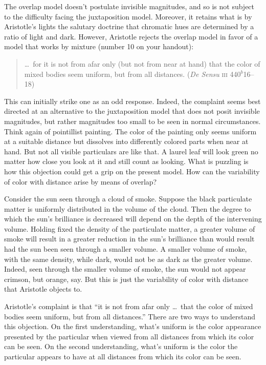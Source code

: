 The overlap model doesn't postulate invisible magnitudes, and so is not subject to the difficulty facing the juxtaposition model. Moreover, it retains what is by Aristotle's lights the salutary doctrine that chromatic hues are determined by a ratio of light and dark. However, Aristotle rejects the overlap model in favor of a model that works by mixture (number 10 on your handout):
\begin{quote}
	\ldots\ for it is not from afar only (but not from near at hand) that the color of mixed bodies seem uniform, but from all distances. (\emph{De Sensu} \textsc{iii} 440\( ^{b} \)16--18)
\end{quote}
This can initially strike one as an odd response. Indeed, the complaint seems best directed at an alternative to the juxtaposition model that does not posit invisible magnitudes, but rather magnitudes too small to be seen in normal circumstances. Think again of pointillist painting. The color of the painting only seems uniform at a suitable distance but dissolves into differently colored parts when near at hand. But not all visible particulars are like that. A laurel leaf will look green no matter how close you look at it and still count as looking. What is puzzling is how this objection could get a grip on the present model. How can the variability of color with distance arise by means of overlap?

Consider the sun seen through a cloud of smoke. Suppose the black particulate matter is uniformly distributed in the volume of the cloud. Then the degree to which the sun's brilliance is decreased will depend on the depth of the intervening volume. Holding fixed the density of the particulate matter, a greater volume of smoke will result in a greater reduction in the sun's brilliance than would result had the sun been seen through a smaller volume. A smaller volume of smoke, with the same density, while dark, would not be as dark as the greater volume. Indeed, seen through the smaller volume of smoke, the sun would not appear crimson, but orange, say. But this is just the variability of color with distance that Aristotle objects to.

Aristotle's complaint is that ``it is not from afar only \ldots\ that the color of mixed bodies seem uniform, but from all distances.'' There are two ways to understand this objection. On the first understanding, what's uniform is the color appearance presented by the particular when viewed from all distances from which its color can be seen. On the second understanding, what's uniform is the color the particular appears to have at all distances from which its color can be seen.

